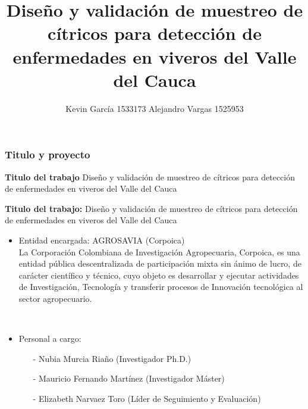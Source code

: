 \documentclass[11pt]{beamer}
\author[Kevin García - Alejandro Vargas]{Kevin García 1533173 \newline Alejandro Vargas 1525953}
\title[Anteproyecto]{Diseño y validación de muestreo de cítricos para detección de enfermedades en viveros del Valle del Cauca}
\begin{document}
\justify
\begin{frame}
\frametitle{Titulo y proyecto}
\begin{block}{\textbf{Titulo del trabajo} }
Diseño y validación de muestreo de cítricos para detección de enfermedades en viveros del Valle del Cauca
\end{block}
\textbf{Titulo del trabajo:} Diseño y validación de muestreo de cítricos para detección de enfermedades en viveros del Valle del Cauca
\begin{itemize}
\justifying
\item Entidad encargada: AGROSAVIA (Corpoica)
~\\La Corporación Colombiana de Investigación Agropecuaria, Corpoica, es una entidad pública descentralizada de participación mixta sin ánimo de lucro, de carácter científico y técnico, cuyo objeto es desarrollar y ejecutar actividades de Investigación, Tecnología y transferir procesos de Innovación tecnológica al sector agropecuario.

~\\
\item Personal a cargo:
\begin{itemize}
\item[-]Nubia Murcia Riaño (Investigador Ph.D.)
\item[-]Mauricio Fernando Martínez (Investigador Máster)
\item[-]Elizabeth Narvaez Toro (Líder de Seguimiento y Evaluación)
\end{itemize}
\end{itemize}
\end{frame}
\end{document}
